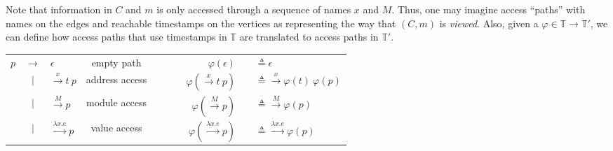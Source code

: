 \documentclass[acmsmall,review]{acmart}\settopmatter{printfolios=true,printccs=false,printacmref=false}
\theoremstyle{definition}
\theoremstyle{plain}
\newcommand*{\Time}{\mathbb{T}}
\newcommand*{\mem}{m}
\begin{document}
Note that information in $C$ and $\mem$ is only accessed through a sequence of names $x$ and $M$.
Thus, one may imagine access ``paths'' with names on the edges and reachable timestamps on the vertices as representing the way that $(C,\mem)$ is \emph{viewed}.
Also, given a $\varphi\in\Time\rightarrow\Time'$, we can define how access paths that use timestamps in $\Time$ are translated to access paths in $\Time'$.
\begin{center}
  \begin{tabular}{rclcrrcl}
    $p$ & $\rightarrow$ & $\epsilon$                   & empty path     & $\qquad$ & $\varphi(\epsilon)$                   & \hspace{-2em} & $\triangleq\epsilon$                              \\
        & $|$           & $\xrightarrow{x}t\:p$        & address access & $\qquad$ & $\varphi(\xrightarrow{x}t\:p)$        & \hspace{-2em} & $\triangleq\xrightarrow{x}\varphi(t)\:\varphi(p)$ \\
        & $|$           & $\xrightarrow{M}p$           & module access  & $\qquad$ & $\varphi(\xrightarrow{M}p)$           & \hspace{-2em} & $\triangleq\xrightarrow{M}\varphi(p)$             \\
        & $|$           & $\xrightarrow{\lambda x.e}p$ & value access   & $\qquad$ & $\varphi(\xrightarrow{\lambda x.e}p)$ & \hspace{-2em} & $\triangleq\xrightarrow{\lambda x.e}\varphi(p)$
  \end{tabular}
\end{center}
\end{document}
